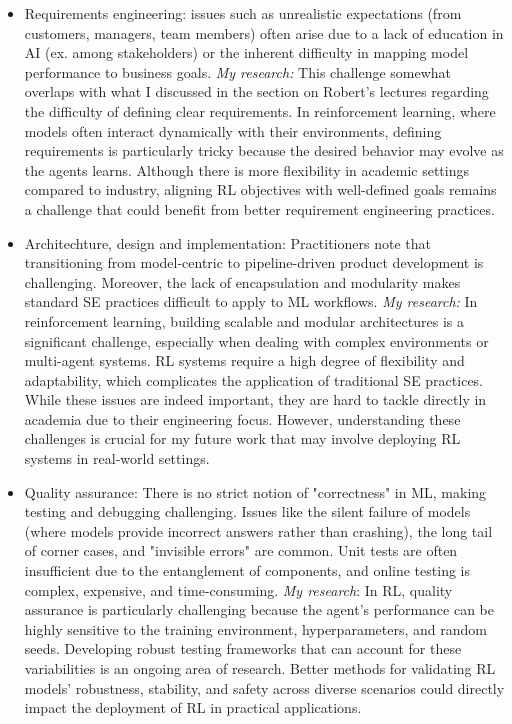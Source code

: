 \documentclass[11pt]{article}
\begin{document}
\begin{itemize}
    \item Requirements engineering: issues such as unrealistic expectations (from customers, managers, team members) often arise due to a lack of education in AI (ex. among stakeholders) or the inherent difficulty in mapping model performance to business goals. \textit{My research:} This challenge somewhat overlaps with what I discussed in the section on Robert's lectures regarding the difficulty of defining clear requirements. In reinforcement learning, where models often interact dynamically with their environments, defining requirements is particularly tricky because the desired behavior may evolve as the agents learns. Although there is more flexibility in academic settings compared to industry, aligning RL objectives with well-defined goals remains a challenge that could benefit from better requirement engineering practices. 
    \item Architechture, design and implementation: Practitioners note that transitioning from model-centric to pipeline-driven product development is challenging. Moreover, the lack of encapsulation and modularity makes standard SE practices difficult to apply to ML workflows. \textit{My research:} In reinforcement learning, building scalable and modular architectures is a significant challenge, especially when dealing with complex environments or multi-agent systems. RL systems require a high degree of flexibility and adaptability, which complicates the application of traditional SE practices. While these issues are indeed important, they are hard to tackle directly in academia due to their engineering focus. However, understanding these challenges is crucial for my future work that may involve deploying RL systems in real-world settings.
    \item Quality assurance: There is no strict notion of "correctness" in ML, making testing and debugging challenging. Issues like the silent failure of models (where models provide incorrect answers rather than crashing), the long tail of corner cases, and "invisible errors" are common. Unit tests are often insufficient due to the entanglement of components, and online testing is complex, expensive, and time-consuming.
    \textit{My research}: In RL, quality assurance is particularly challenging because the agent's performance can be highly sensitive to the training environment, hyperparameters, and random seeds. Developing robust testing frameworks that can account for these variabilities is an ongoing area of research. Better methods for validating RL models' robustness, stability, and safety across diverse scenarios could directly impact the deployment of RL in practical applications.

\end{itemize}
\end{document}
